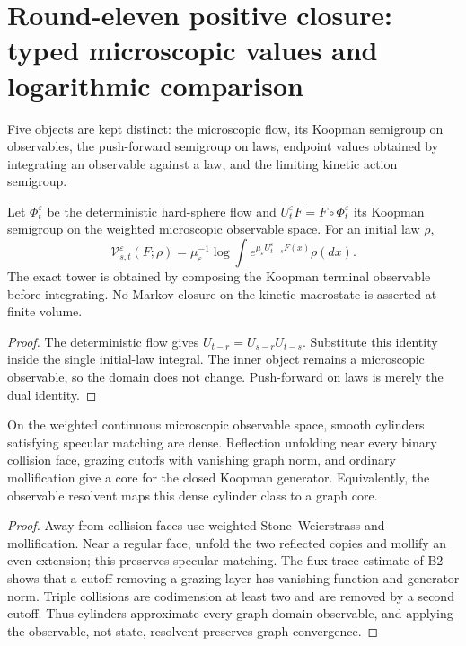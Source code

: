 \section{Round-eleven positive closure: typed microscopic values and logarithmic comparison}
\label{sec:r11-b4}

Five objects are kept distinct: the microscopic flow, its Koopman semigroup on
observables, the push-forward semigroup on laws, endpoint values obtained by
integrating an observable against a law, and the limiting kinetic action
semigroup.

\begin{theorem}
\label{thm:r11-b4-tower}
Let $\Phi_t^\varepsilon$ be the deterministic hard-sphere flow and
$U_t^\varepsilon F=F\circ\Phi_t^\varepsilon$ its Koopman semigroup on the
weighted microscopic observable space.  For an initial law $\rho$,
\[
 \mathcal V_{s,t}^\varepsilon(F;\rho)
 =\mu_\varepsilon^{-1}\log
   \int e^{\mu_\varepsilon U_{t-s}^\varepsilon F(x)}\rho(dx).
\]
The exact tower is obtained by composing the Koopman terminal observable
before integrating.  No Markov closure on the kinetic macrostate is asserted
at finite volume.
\end{theorem}

\begin{proof}
The deterministic flow gives $U_{t-r}=U_{s-r}U_{t-s}$.  Substitute this
identity inside the single initial-law integral.  The inner object remains a
microscopic observable, so the domain does not change.  Push-forward on laws
is merely the dual identity.
\end{proof}

\begin{theorem}
\label{thm:r11-b4-core}
On the weighted continuous microscopic observable space, smooth cylinders
satisfying specular matching are dense.  Reflection unfolding near every
binary collision face, grazing cutoffs with vanishing graph norm, and ordinary
mollification give a core for the closed Koopman generator.  Equivalently, the
observable resolvent maps this dense cylinder class to a graph core.
\end{theorem}

\begin{proof}
Away from collision faces use weighted Stone--Weierstrass and mollification.
Near a regular face, unfold the two reflected copies and mollify an even
extension; this preserves specular matching.  The flux trace estimate of B2
shows that a cutoff removing a grazing layer has vanishing function and
generator norm.  Triple collisions are codimension at least two and are
removed by a second cutoff.  Thus cylinders approximate every graph-domain
observable, and applying the observable, not state, resolvent preserves graph
convergence.
\end{proof}

